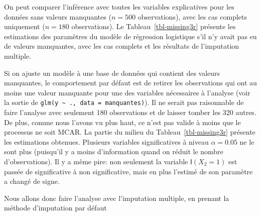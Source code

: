 \documentclass[
  11pt,
  letterpaper,
]{scrbook}
\theoremstyle{definition}
\theoremstyle{remark}
\begin{document}
On peut comparer l'inférence avec toutes les variables explicatives pour
les données sans valeurs manquantes (\(n=500\) observations), avec les
cas complets uniquement (\(n=180\) observations). Le
Tableau~\ref{tbl-missing3r} présente les estimations des paramètres du
modèle de régression logistique s'il n'y avait pas eu de valeurs
manquantes, avec les cas complets et les résultats de l'imputation
multiple.

Si on ajuste un modèle à une base de données qui contient des valeurs
manquantes, le comportement par défaut est de retirer les observations
qui ont au moins une valeur manquante pour une des variables nécessaires
à l'analyse (voir la sortie de
\texttt{glm(y\ \textasciitilde{}\ .,\ data\ =\ manquantes)}). Il ne
serait pas raisonnable de faire l'analyse avec seulement 180
observations et de laisser tomber les 320 autres. De plus, comme nous
l'avons vu plus haut, ce n'est pas valide à moins que le processus ne
soit MCAR. La partie du milieu du Tableau~\ref{tbl-missing3r} présente
les estimations obtenues. Plusieurs variables significatives à niveau
\(\alpha=0.05\) ne le sont plus (puisqu'il y a moins d'information quand
on réduit le nombre d'observations). Il y a même pire: non seulement la
variable \(\mathsf{I}(X_2=1)\) est passée de significative à non
significative, mais en plus l'estimé de son paramètre a changé de signe.

Nous allons donc faire l'analyse avec l'imputation multiple, en prenant
la méthode d'imputation par défaut
\end{document}
